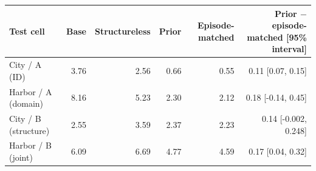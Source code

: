 \begin{tabular}{lrrrrr}
\toprule
Test cell & Base & Structureless & Prior & Episode-matched & Prior $-$ episode-matched [95\% interval] \\
\midrule
City / A (ID) & 3.76 & 2.56 & 0.66 & 0.55 & 0.11 [0.07, 0.15] \\
Harbor / A (domain) & 8.16 & 5.23 & 2.30 & 2.12 & 0.18 [-0.14, 0.45] \\
City / B (structure) & 2.55 & 3.59 & 2.37 & 2.23 & 0.14 [-0.002, 0.248] \\
Harbor / B (joint) & 6.09 & 6.69 & 4.77 & 4.59 & 0.17 [0.04, 0.32] \\
\bottomrule
\end{tabular}
